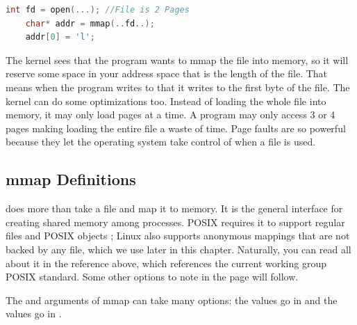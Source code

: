 \begin{lstlisting}[language=C]
	int fd = open(...); //File is 2 Pages
	char* addr = mmap(..fd..);
	addr[0] = 'l';
\end{lstlisting}
	 
The kernel sees that the program wants to mmap the file into memory, so it will reserve some space in your address space that is the length of the file.
That means when the program writes to  that it writes to the first byte of the file.
The kernel can do some optimizations too.
Instead of loading the whole file into memory, it may only load pages at a time.
A program may only access 3 or 4 pages making loading the entire file a waste of time.
Page faults are so powerful because they let the operating system take control of when a file is used.
	 
\subsection{mmap Definitions}
	 
 does more than take a file and map it to memory.
It is the general interface for creating shared memory among processes.
POSIX requires it to support regular files and POSIX  objects \cite{mmap_2018}; Linux also supports anonymous mappings that are not backed by any file, which we use later in this chapter.
Naturally, you can read all about it in the reference above, which references the current working group POSIX standard.
Some other options to note in the page will follow.
	 
The  and  arguments of mmap can take many options: the  values go in  and the  values go in .
	 
